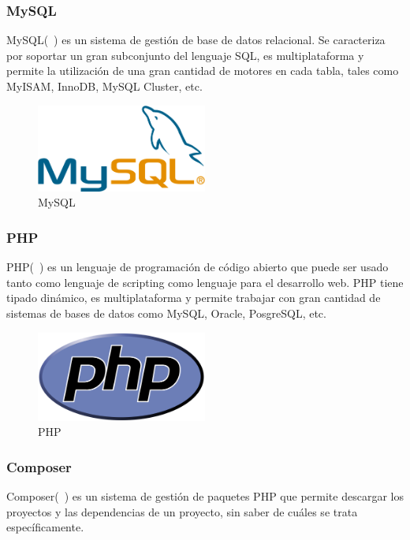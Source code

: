\subsubsection*{MySQL}

MySQL(~\cite{mysql}) es un sistema de gestión de base de datos relacional. Se caracteriza por soportar un gran subconjunto del lenguaje SQL, es multiplataforma y permite la utilización de una gran cantidad de motores en cada tabla, tales como MyISAM, InnoDB, MySQL Cluster, etc.

\begin{figure}[tbh]
\centering
\label{fig:mysql}
\includegraphics[width=0.5\textwidth]{imagenes/MySQL}
\caption{MySQL}
\end{figure}

\subsubsection*{PHP}

PHP(~\cite{php}) es un lenguaje de programación de código abierto que puede ser usado tanto como lenguaje de scripting como lenguaje para el desarrollo web. PHP tiene tipado dinámico, es multiplataforma y permite trabajar con gran cantidad de sistemas de bases de datos como MySQL, Oracle, PosgreSQL, etc.

\begin{figure}[tbh]
\centering
\label{fig:php}
\includegraphics[width=0.5\textwidth]{imagenes/PHP}
\caption{PHP}
\end{figure}

\subsubsection*{Composer}

Composer(~\cite{composer}) es un sistema de gestión de paquetes PHP que permite descargar los proyectos y las dependencias de un proyecto, sin saber de cuáles se trata específicamente.

